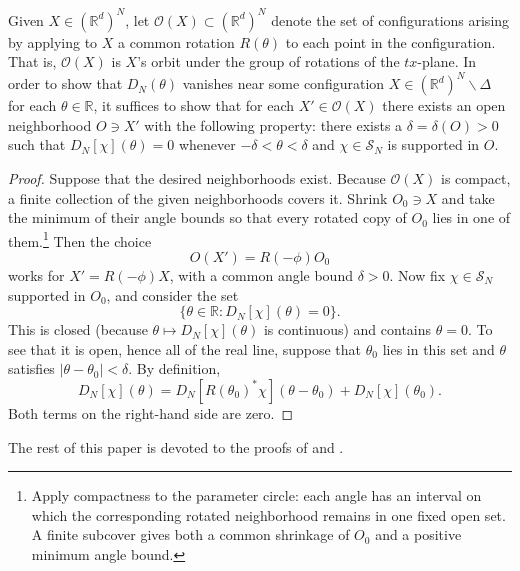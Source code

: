\documentclass[11pt, letterpaper, reqno]{amsart}
\theoremstyle{definition}
\newenvironment{lemma}
{\pushQED{\qed}\renewcommand{\qedsymbol}{$\blacksquare$}\lemmax}
{\popQED\endlemmax}
\theoremstyle{remark}
\newcommand{\bbR}{\mathbb{R}}
\newcommand{\calO}{\mathcal{O}}
\newcommand{\calS}{\mathcal{S}}
\begin{document}
Given $X\in (\bbR^d)^N$, let $\calO(X)\subset (\bbR^d)^N$ denote the set of configurations arising by applying to $X$ a common rotation $R(\theta)$ to each point in the configuration. That is, $\calO(X)$ is $X$'s orbit under the group of rotations of the $tx$-plane.
\begin{lemma}\label{lem:small_angle}
     In order to show that $D_N(\theta)$ vanishes near some configuration $X\in (\bbR^d)^N\backslash \Delta$ for each $\theta\in \bbR$, it suffices to show that for each $X'\in \calO(X)$ there exists an open neighborhood $O\ni X'$ with the following property:  there exists a $\delta=\delta(O)>0$ such that $D_N[\chi](\theta)=0$ whenever $-\delta<\theta<\delta$ and $\chi \in \calS_N$ is supported in $O$. 
\end{lemma}
\begin{proof}
    Suppose that the desired neighborhoods exist. Because $\calO(X)$ is compact, a finite collection of the given neighborhoods covers it. Shrink $O_0\ni X$ and take the minimum of their angle bounds so that every rotated copy of $O_0$ lies in one of them.\footnote{Apply compactness to the parameter circle: each angle has an interval on which the corresponding rotated neighborhood remains in one fixed open set. A finite subcover gives both a common shrinkage of $O_0$ and a positive minimum angle bound.} Then the choice 
    \begin{equation} 
    O(X') = R(-\phi) O_0
    \end{equation} 
    works for $X'=R(-\phi)X$, with a common angle bound $\delta>0$.
    Now fix $\chi\in \calS_N$ supported in $O_0$, and consider the set 
    \begin{equation}
        \{\theta\in \bbR: D_N[\chi](\theta)=0\}.
    \end{equation}
    This is closed (because $\theta\mapsto D_N[\chi](\theta)$ is continuous) and contains $\theta=0$. 
    To see that it is open, hence all of the real line, suppose that $\theta_0$ lies in this set and $\theta$ satisfies $|\theta-\theta_0|<\delta$. By definition, 
    \begin{equation}
        D_N[\chi](\theta) = D_N[R(\theta_0)^* \chi ](\theta-\theta_0) + D_N[\chi](\theta_0).
    \end{equation}
    Both terms on the right-hand side are zero.
\end{proof}



The rest of this paper is devoted to the proofs of  and .
\end{document}
